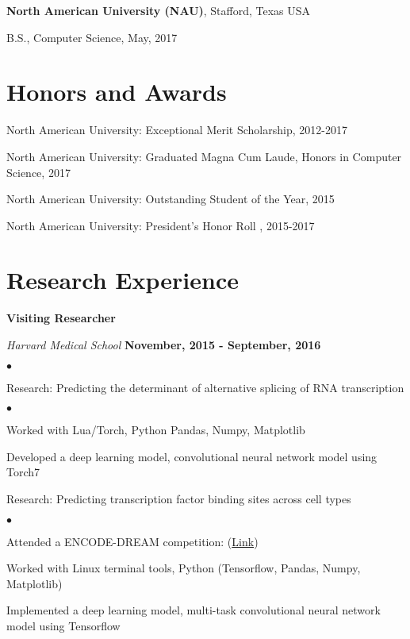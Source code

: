 \documentclass[margin,line]{res}
\newenvironment{list1}{
  \begin{list}{\ding{113}}{%
      \setlength{\itemsep}{0in}
      \setlength{\parsep}{0in} \setlength{\parskip}{0in}
      \setlength{\topsep}{0in} \setlength{\partopsep}{0in} 
      \setlength{\leftmargin}{0.17in}}}{\end{list}}
\newenvironment{list2}{
  \begin{list}{$\bullet$}{%
      \setlength{\itemsep}{0in}
      \setlength{\parsep}{0in} \setlength{\parskip}{0in}
      \setlength{\topsep}{0in} \setlength{\partopsep}{0in} 
      \setlength{\leftmargin}{0.2in}}}{\end{list}}
\begin{document}
\begin{resume}
{\bf North American University (NAU)}, Stafford, Texas USA\\
\vspace*{-.1in}
\begin{list1}
\item[] B.S., Computer Science,  May, 2017
\end{list1}


\section{\sc Honors and Awards} 


North American University: Exceptional Merit Scholarship, 2012-2017

\vspace*{-2.5mm}
North American University: Graduated Magna Cum Laude, Honors in Computer Science, 2017

\vspace*{-2.5mm}
North American University: Outstanding Student of the Year, 2015

\vspace*{-2.5mm}
North American University: President's Honor Roll , 2015-2017


\section{\sc Research Experience}

{\bf Visiting Researcher}

\vspace{-.3cm}
{\em Harvard Medical School} \hfill {\bf November, 2015 - September, 2016}\\
\vspace{-.3cm}
\begin{list2}
\item Research: Predicting the determinant of alternative splicing of RNA transcription
\begin{list2}
\item Worked with Lua/Torch, Python Pandas, Numpy, Matplotlib
\item Developed a deep learning model, convolutional neural network model using Torch7 
\end{list2}
\item Research: Predicting transcription factor binding sites across cell types
\begin{list2}
\item Attended a ENCODE-DREAM competition: (\href{https://www.synapse.org/#!Synapse:syn6131484}{Link})
\item Worked with Linux terminal tools, Python (Tensorflow, Pandas, Numpy, Matplotlib)
\item Implemented a deep learning model, multi-task convolutional neural network model using Tensorflow
\end{list2}
\end{list2}


\end{resume}
\end{document}
